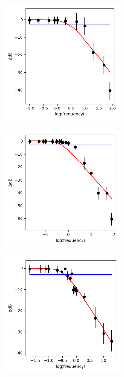 \documentclass{article}
\begin{document}
 \begin{figure}[H]
  \begin{subfigure}[b]{6.3cm}
      \centering
      \includegraphics[width=6.3cm]{../results/low_pass_filter_gain_freq_plot(db_oct6)(time_constant0.03).png}
      \caption{}
  \end{subfigure}
  \hfill
  \begin{subfigure}[b]{6.3cm}
    \centering
    \includegraphics[width=6.3cm]{../results/low_pass_filter_gain_freq_plot(db_oct6)(time_constant0.1).png}
    \caption{}
\end{subfigure}
\hfill
\begin{subfigure}[b]{6.3cm}
  \centering
  \includegraphics[width=6.3cm]{../results/low_pass_filter_gain_freq_plot(db_oct6)(time_constant0.3).png}

\end{subfigure}
\end{figure}
\end{document}
